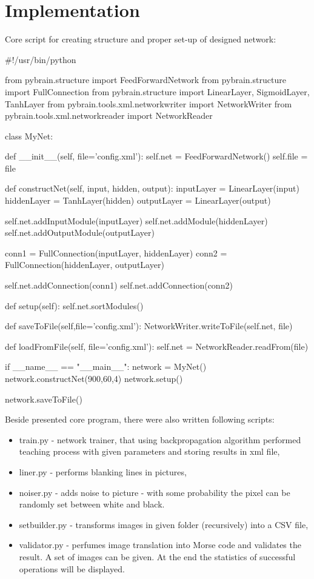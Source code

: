 \documentclass[eng,openany]{mgr}
\begin{document}
\section{Implementation}
Core script for creating structure and proper set-up of designed network:
\\
\begin{python}
#!/usr/bin/python

from pybrain.structure import FeedForwardNetwork
from pybrain.structure import FullConnection
from pybrain.structure import LinearLayer, SigmoidLayer, TanhLayer
from pybrain.tools.xml.networkwriter import NetworkWriter
from pybrain.tools.xml.networkreader import NetworkReader

class MyNet:

	def __init__(self, file='config.xml'):
		self.net = FeedForwardNetwork()
		self.file = file

	def constructNet(self, input, hidden, output): 
		inputLayer = LinearLayer(input)
		hiddenLayer = TanhLayer(hidden)
		outputLayer = LinearLayer(output)

		self.net.addInputModule(inputLayer)
		self.net.addModule(hiddenLayer)
		self.net.addOutputModule(outputLayer)

		conn1 = FullConnection(inputLayer, hiddenLayer)
		conn2 = FullConnection(hiddenLayer, outputLayer)

		self.net.addConnection(conn1)
		self.net.addConnection(conn2)

	def setup(self):
		self.net.sortModules()
	
	def saveToFile(self,file='config.xml'):
		NetworkWriter.writeToFile(self.net, file)

	def loadFromFile(self, file='config.xml'):
		self.net = NetworkReader.readFrom(file)

if __name__ == "__main__":
	network = MyNet()
	network.constructNet(900,60,4)
	network.setup()

	network.saveToFile()
\end{python}
Beside presented core program, there were also written following scripts:
\begin{itemize}
\item train.py - network trainer, that using backpropagation algorithm performed teaching process with given parameters and storing results in xml file,
\item liner.py - performs blanking lines in pictures,
\item noiser.py - adds noise to picture - with some probability the pixel can be randomly set between white and black.
\item setbuilder.py - transforms images in given folder (recursively) into a CSV file,
\item validator.py - perfumes image translation into Morse code and validates the result. A set of images can be given. At the end the statistics of successful operations will be displayed.
\end{itemize}
\end{document}
